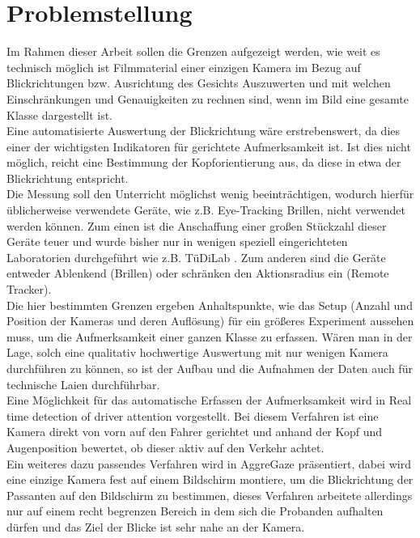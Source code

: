 \section{Problemstellung}
\label{Problemstellung}
Im Rahmen dieser Arbeit sollen die Grenzen aufgezeigt werden, wie weit es technisch möglich ist Filmmaterial einer einzigen Kamera im Bezug auf Blickrichtungen bzw. Ausrichtung des Gesichts Auszuwerten und mit welchen Einschränkungen und Genauigkeiten zu rechnen sind, wenn im Bild eine gesamte Klasse dargestellt ist.\\
Eine automatisierte Auswertung der Blickrichtung wäre erstrebenswert, da dies einer der wichtigsten Indikatoren für gerichtete Aufmerksamkeit ist. Ist dies nicht möglich, reicht eine Bestimmung der Kopforientierung aus, da diese in etwa der Blickrichtung entspricht.\\
Die Messung soll den Unterricht möglichst wenig beeinträchtigen, wodurch hierfür üblicherweise verwendete Geräte, wie z.B. Eye-Tracking Brillen, nicht verwendet werden können. Zum einen ist die Anschaffung einer großen Stückzahl dieser Geräte teuer und wurde bisher nur in wenigen speziell eingerichteten Laboratorien durchgeführt wie z.B. TüDiLab \cite{TueDiLab}. Zum anderen sind die Geräte entweder Ablenkend (Brillen) oder schränken den Aktionsradius ein (Remote Tracker).\\
Die hier bestimmten Grenzen ergeben Anhaltspunkte, wie das Setup (Anzahl und Position der Kameras und deren Auflösung) für ein größeres Experiment aussehen muss, um die Aufmerksamkeit einer ganzen Klasse zu erfassen. Wären man in der Lage, solch eine qualitativ hochwertige Auswertung mit nur wenigen Kamera durchführen zu können, so ist der Aufbau und die Aufnahmen der Daten auch für technische Laien durchführbar.\\
Eine Möglichkeit für das automatische Erfassen der Aufmerksamkeit wird in \glqq Real time detection of driver attention\grqq\cite{driverAttention} vorgestellt. Bei diesem Verfahren ist eine Kamera direkt von vorn auf den Fahrer gerichtet und anhand der Kopf und Augenposition bewertet, ob dieser aktiv auf den Verkehr achtet.\\
Ein weiteres dazu passendes Verfahren wird in \glqq AggreGaze\grqq \cite{AggreGaze} präsentiert, dabei wird eine einzige Kamera fest auf einem Bildschirm montiere, um die Blickrichtung der Passanten auf den Bildschirm zu bestimmen, dieses Verfahren arbeitete allerdings nur auf einem recht begrenzen Bereich in dem sich die Probanden aufhalten dürfen und das Ziel der Blicke ist sehr nahe an der Kamera.\\
